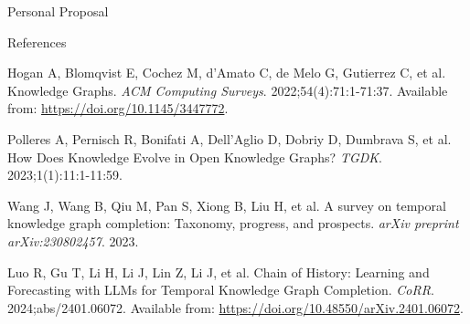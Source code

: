 \documentclass{beamer}
\begin{document}
    \begin{frame}{Personal Proposal}
        
    \end{frame}

    \begin{frame}{References}
    \footnotesize
        \begin{thebibliography}{99}

        Hogan A, Blomqvist E, Cochez M, d’Amato C, de Melo G, Gutierrez C, et al. Knowledge Graphs. \textit{ACM Computing Surveys}. 2022;54(4):71:1-71:37. Available from: \url{https://doi.org/10.1145/3447772}.
        
        Polleres A, Pernisch R, Bonifati A, Dell’Aglio D, Dobriy D, Dumbrava S, et al. How Does Knowledge Evolve in Open Knowledge Graphs? \textit{TGDK}. 2023;1(1):11:1-11:59.

        Wang J, Wang B, Qiu M, Pan S, Xiong B, Liu H, et al. A survey on temporal knowledge graph completion: Taxonomy, progress, and prospects. \textit{arXiv preprint arXiv:230802457}. 2023.

        Luo R, Gu T, Li H, Li J, Lin Z, Li J, et al. Chain of History: Learning and Forecasting with LLMs for Temporal Knowledge Graph Completion. \textit{CoRR}. 2024;abs/2401.06072. Available from: \url{https://doi.org/10.48550/arXiv.2401.06072}.

    \end{thebibliography}
    \end{frame}
\end{document}
